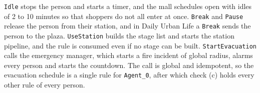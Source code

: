 \texttt{Idle} stops the person and starts a timer, and the mall schedules open with idles of 2 to 10 minutes so that shoppers do not all enter at once. \texttt{Break} and \texttt{Pause} release the person from their station, and in Daily Urban Life a \texttt{Break} sends the person to the plaza. \texttt{UseStation} builds the stage list and starts the station pipeline, and the rule is consumed even if no stage can be built. \texttt{StartEvacuation} calls the emergency manager, which starts a fire incident of global radius, alarms every person and starts the countdown. The call is global and idempotent, so the evacuation schedule is a single rule for \texttt{Agent\_0}, after which check (c) holds every other rule of every person.

\endgroup


